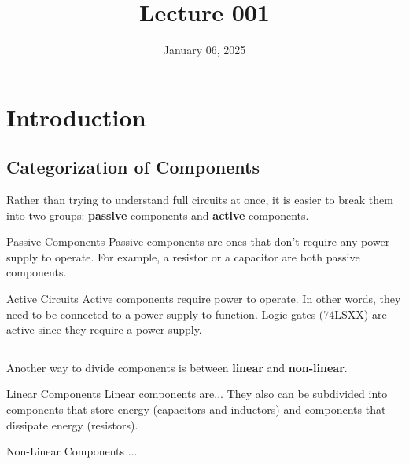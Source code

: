 \documentclass[12pt]{article}
\title{Lecture 001}
\date{January 06, 2025}
\begin{document}
\section{Introduction}
\label{sec:introduction}

\subsection{Categorization of Components}
\label{ssec:categorizationOfComponents}

Rather than trying to understand full circuits at once, it is easier to break them into two groups: \textbf{passive} components and \textbf{active} components.

\begin{definition}{Passive Components}
  Passive components are ones that don't require any power supply to operate. For example, a resistor or a capacitor are both passive components.
\end{definition}

\begin{definition}{Active Circuits}
  Active components require power to operate. In other words, they need to be connected to a power supply to function. Logic gates (74LSXX) are active since they require a power supply.
\end{definition}

\vspace{12pt}
\hrule
\vspace{08pt}

Another way to divide components is between \textbf{linear} and \textbf{non-linear}.

\begin{definition}{Linear Components}
  Linear components are... They also can be subdivided into components that store energy (capacitors and inductors) and components that dissipate energy (resistors).
\end{definition}

\begin{definition}{Non-Linear Components}
  ...
\end{definition}
\end{document}
